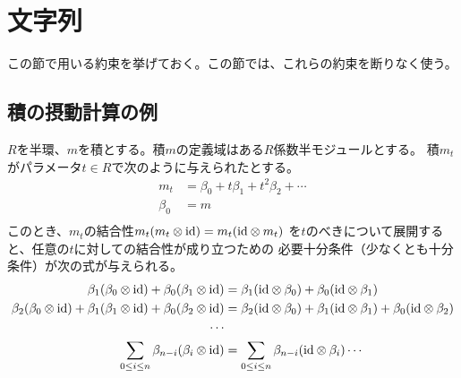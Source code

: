 \section{文字列}\label{s1:文字列} %
	この節で用いる約束を挙げておく。この節では、これらの約束を断りなく使う。
	

	\subsection{積の摂動計算の例}\label{s2:積の摂動計算の例} %
		$R$を半環、$m$を積とする。積$m$の定義域はある$R$係数半モジュールとする。
		積$m_t$がパラメータ$t\in R$で次のように与えられたとする。
		\begin{equation*}\begin{split} %
			m_t &= \beta_0 + t\beta_1 + t^2\beta_2 + \cdots \\
			\beta_0 &= m \\
		\end{split}\end{equation*} %
		このとき、$m_t$の結合性$m_t(m_t\otimes {\operatorname{id}})=m_t({\operatorname{id}}\otimes m_t)$
		を$t$のべきについて展開すると、任意の$t$に対しての結合性が成り立つための
		必要十分条件（少なくとも十分条件）が次の式が与えられる。
		\begin{equation*}\begin{split} %
			\beta_1(\beta_0\otimes \myid) + \beta_0(\beta_1\otimes \myid)
			&= \beta_1(\myid\otimes \beta_0) + \beta_0(\myid\otimes \beta_1)
			\\
			\beta_2(\beta_0\otimes \myid) + \beta_1(\beta_1\otimes \myid)
			+ \beta_0(\beta_2\otimes \myid)
			&= \beta_2(\myid\otimes \beta_0) + \beta_1(\myid\otimes \beta_1)
			+ \beta_0(\myid\otimes \beta_2)
			\\
			\cdots \\
			\sum_{0\le i\le n}\beta_{n-i}(\beta_i\otimes \myid)
			&= \sum_{0\le i\le n}\beta_{n-i}(\myid\otimes \beta_i)
			\cdots \\
		\end{split}\end{equation*} %

